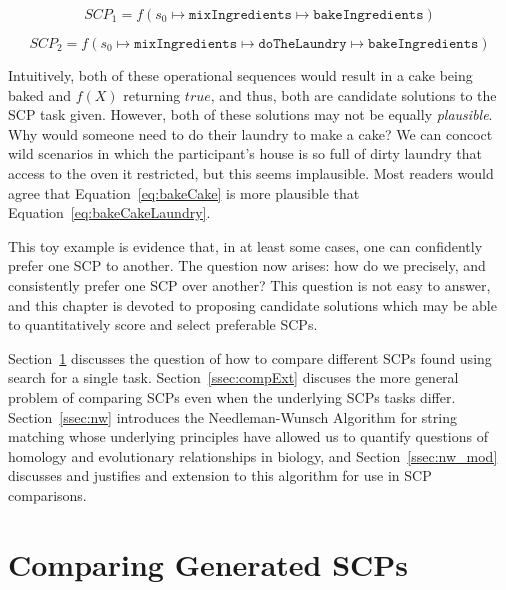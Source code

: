 \documentclass[
11pt, %
english, %
singlespacing, %
headsepline, %
]{MastersDoctoralThesis} %
\begin{document}
\begin{equation} \label{eq:bakeCake}
SCP_1 = f(s_0\longmapsto \texttt{mixIngredients} \longmapsto \texttt{bakeIngredients})
\end{equation}

\begin{equation} \label{eq:bakeCakeLaundry}
SCP_2 = f(s_0 \longmapsto \texttt{mixIngredients} \longmapsto  \texttt{doTheLaundry} \longmapsto \texttt{bakeIngredients})
\end{equation}

Intuitively, both of these operational sequences would result in a cake being baked and $f(X)$ returning $true$, and thus, both are candidate solutions to the SCP task given. However, both of these solutions may not be equally \textit{plausible}. Why would someone need to do their laundry to make a cake? We can concoct wild scenarios in which the participant's house is so full of dirty laundry that access to the oven it restricted, but this seems implausible. Most readers would agree that Equation~\ref{eq:bakeCake} is more plausible that Equation~\ref{eq:bakeCakeLaundry}.

This toy example is evidence that, in at least some cases, one can confidently prefer one SCP to another. The question now arises: how do we precisely, and consistently prefer one SCP over another? This question is not easy to answer, and this chapter is devoted to proposing candidate solutions which may be able to quantitatively score and select preferable SCPs.

Section~\ref{ssec:compGen} discusses the question of how to compare different SCPs found using search for a single task. Section~\ref{ssec:compExt} discuses the more general problem of comparing SCPs even when the underlying SCPs tasks differ. Section~\ref{ssec:nw} introduces the Needleman-Wunsch Algorithm for string matching whose underlying principles have allowed us to quantify questions of homology and evolutionary relationships in biology, and Section~\ref{ssec:nw_mod} discusses and justifies and extension to this algorithm for use in SCP comparisons.

\section{Comparing Generated SCPs} \label{ssec:compGen}
\end{document}
